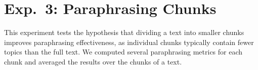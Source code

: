 \section{Exp.\ 3: Paraphrasing Chunks}
\label{sec:results_chunks}

This experiment tests the hypothesis that dividing a text into smaller chunks improves paraphrasing effectiveness, as individual chunks typically contain fewer topics than the full text. 
We computed several paraphrasing metrics for each chunk and averaged the results over the chunks of a text.

\begin{table}[t]
\centering
\caption[Impact of the number of chunks on paraphrase measures]{Impact of the number of chunks on syntactic and semantic paraphrase measures. 
Impact is reported as the absolute change between a single-chunk paraphrase and the maximum number of chunks (i.e.\ 5). 
Bold values indicate the largest observed changes. 
Ideally, syntactic measures should be minimised, while semantic measures are maximised.}
\label{tab:impact_chunks_dataset_paraphraser}
\end{table}

